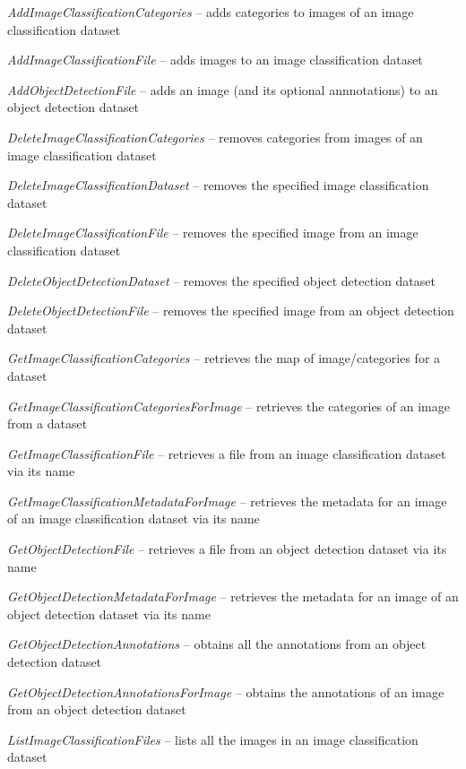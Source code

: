 \documentclass[a4paper]{book}
\begin{document}
\begin{tight_itemize}
  \item \textit{AddImageClassificationCategories} -- adds categories to images of an image classification dataset
  \item \textit{AddImageClassificationFile} -- adds images to an image classification dataset
  \item \textit{AddObjectDetectionFile} -- adds an image (and its optional annnotations) to an object detection dataset
  \item \textit{DeleteImageClassificationCategories} -- removes categories from images of an image classification dataset
  \item \textit{DeleteImageClassificationDataset} -- removes the specified image classification dataset
  \item \textit{DeleteImageClassificationFile} -- removes the specified image from an image classification dataset
  \item \textit{DeleteObjectDetectionDataset} -- removes the specified object detection dataset
  \item \textit{DeleteObjectDetectionFile} -- removes the specified image from an object detection dataset
  \item \textit{GetImageClassificationCategories} -- retrieves the map of image/categories for a dataset
  \item \textit{GetImageClassificationCategoriesForImage} -- retrieves the categories of an image from a dataset
  \item \textit{GetImageClassificationFile} -- retrieves a file from an image classification dataset via its name
  \item \textit{GetImageClassificationMetadataForImage} -- retrieves the metadata for an image of an image classification dataset via its name
  \item \textit{GetObjectDetectionFile} -- retrieves a file from an object detection dataset via its name
  \item \textit{GetObjectDetectionMetadataForImage} -- retrieves the metadata for an image of an object detection dataset via its name
  \item \textit{GetObjectDetectionAnnotations} -- obtains all the annotations from an object detection dataset
  \item \textit{GetObjectDetectionAnnotationsForImage} -- obtains the annotations of an image from an object detection dataset
  \item \textit{ListImageClassificationFiles} -- lists all the images in an image classification dataset

\end{tight_itemize}
\end{document}
